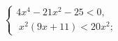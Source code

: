 \begin{ex}[type=ineq_system]
	\begin{condition}
		$\begin{cases} 4x^4 - 21x^2 - 25<0 ,\\
			\;x^2(9x + 11)<20x^2  ;
		\end{cases}$
	\end{condition}
\end{ex}